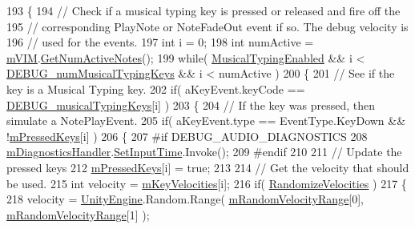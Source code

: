 \begin{DoxyCode}
193     \{
194         \textcolor{comment}{// Check if a musical typing key is pressed or released and fire off the }
195         \textcolor{comment}{// corresponding PlayNote or NoteFadeOut event if so. The debug velocity is }
196         \textcolor{comment}{// used for the events.}
197         \textcolor{keywordtype}{int} i = 0;
198         \textcolor{keywordtype}{int} numActive = \hyperlink{group___mus_typ_priv_var_ga63b2c5e1f9b1320a6b435a9018759444}{mVIM}.\hyperlink{group___v_i_m_pub_func_ga3d6c823b1c1083eac8202f6c89e60b48}{GetNumActiveNotes}();
199         \textcolor{keywordflow}{while}( \hyperlink{group___mus_typ_pub_var_ga09a764161d537b31fac1a64ee5d39625}{MusicalTypingEnabled} && i < 
      \hyperlink{group___mus_typ_const_ga1a5182f5dda1cd3a5b400911a3f4cb69}{DEBUG\_numMusicalTypingKeys} && i < numActive )
200         \{
201             \textcolor{comment}{// See if the key is a Musical Typing key.}
202             \textcolor{keywordflow}{if}( aKeyEvent.keyCode == \hyperlink{group___mus_typ_const_gad8b9000a0b6c93d23310f54d07dd0b90}{DEBUG\_musicalTypingKeys}[i] )
203             \{
204                 \textcolor{comment}{// If the key was pressed, then simulate a NotePlayEvent.}
205                 \textcolor{keywordflow}{if}( aKeyEvent.type == EventType.KeyDown && !\hyperlink{group___mus_typ_priv_var_gaede8bc4123f7bfe514816593fdfbec67}{mPressedKeys}[i] )
206                 \{
207 \textcolor{preprocessor}{                    #if DEBUG\_AUDIO\_DIAGNOSTICS}
208                         \hyperlink{group___mus_typ_priv_var_gaaeabcb1c6445b0ff93059036cc4ec1f4}{mDiagnosticsHandler}.\hyperlink{group___audio_testing_a133561901c2aef535b2f3c098e55b959}{SetInputTime}.Invoke();
209 \textcolor{preprocessor}{                    #endif}
210 
211                     \textcolor{comment}{// Update the pressed keys}
212                     \hyperlink{group___mus_typ_priv_var_gaede8bc4123f7bfe514816593fdfbec67}{mPressedKeys}[i] = \textcolor{keyword}{true};
213 
214                     \textcolor{comment}{// Get the velocity that should be used.}
215                     \textcolor{keywordtype}{int} velocity = \hyperlink{group___mus_typ_priv_var_ga4836c9fe1805279497f421a29879bf5a}{mKeyVelocities}[i];
216                     \textcolor{keywordflow}{if}( \hyperlink{group___mus_typ_pub_var_gad09f6f673034d9cd95f699838c9518d5}{RandomizeVelocities} )
217                     \{
218                         velocity = \hyperlink{namespace_unity_engine}{UnityEngine}.Random.Range( 
      \hyperlink{group___mus_typ_priv_var_ga15df83911d88e77e46726ff5642d04e6}{mRandomVelocityRange}[0], \hyperlink{group___mus_typ_priv_var_ga15df83911d88e77e46726ff5642d04e6}{mRandomVelocityRange}[1] );

\end{DoxyCode}
